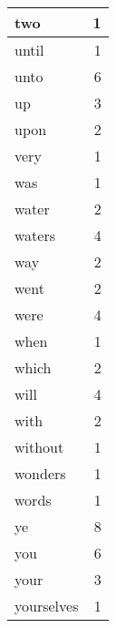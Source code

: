 \begin{center}
\begin{longtable}{l|r}
two & 1 \\ \hline
until & 1 \\ \hline
unto & 6 \\ \hline
up & 3 \\ \hline
upon & 2 \\ \hline
very & 1 \\ \hline
was & 1 \\ \hline
water & 2 \\ \hline
waters & 4 \\ \hline
way & 2 \\ \hline
went & 2 \\ \hline
were & 4 \\ \hline
when & 1 \\ \hline
which & 2 \\ \hline
will & 4 \\ \hline
with & 2 \\ \hline
without & 1 \\ \hline
wonders & 1 \\ \hline
words & 1 \\ \hline
ye & 8 \\ \hline
you & 6 \\ \hline
your & 3 \\ \hline
yourselves & 1 \\ \hline
\end{longtable}
\end{center}



\normalsize



